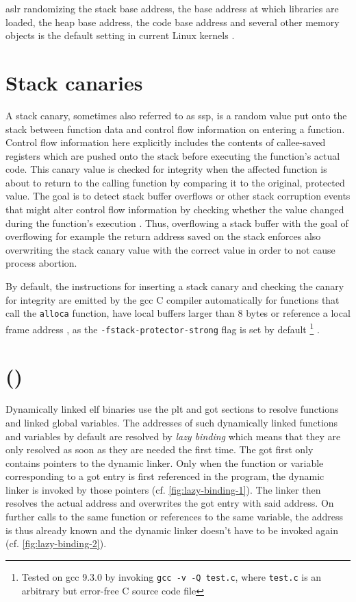\gls{aslr} randomizing the stack base address, the base address at which libraries are loaded, the heap base address, the code base address and several other memory objects is the default setting in current Linux kernels \cites{Boelen2018,Kernel2020a}[14]{OracleCorporation2020}.

\section{Stack canaries}
\label{sec:stack-canaries}

A stack canary, sometimes also referred to as \gls{ssp}, is a random value put onto the stack between function data and control flow information on entering a function.
Control flow information here explicitly includes the contents of callee-saved registers which are pushed onto the stack before executing the function's actual code.
This canary value is checked for integrity when the affected function is about to return to the calling function by comparing it to the original, protected value.
The goal is to detect stack buffer overflows or other stack corruption events that might alter control flow information by checking whether the value changed during the function's execution \cites[2]{Bierbaumer2018}{FSF2019}.
Thus, overflowing a stack buffer with the goal of overflowing for example the return address saved on the stack enforces also overwriting the stack canary value with the correct value in order to not cause process abortion.

By default, the instructions for inserting a stack canary and checking the canary for integrity are emitted by the \gls{gcc} C compiler automatically for functions that call the \texttt{alloca} function, have local buffers larger than 8 bytes or reference a local frame address \cite{FSF2019}, as the \texttt{-fstack-protector-strong} flag is set by default%
	\footnote{Tested on \gls{gcc} 9.3.0 by invoking \texttt{gcc -v -Q test.c}, where \texttt{test.c} is an arbitrary but error-free C source code file}%
.

\section{ ()}
\label{sec:relro}

Dynamically linked \gls{elf} binaries use the \gls{plt} and \gls{got} sections to resolve functions and linked global variables.
The addresses of such dynamically linked functions and variables by default are resolved by \emph{lazy binding} which means that they are only resolved as soon as they are needed the first time.
The \gls{got} first only contains pointers to the dynamic linker.
Only when the function or variable corresponding to a \gls{got} entry is first referenced in the program, the dynamic linker is invoked by those pointers (cf. \cref{fig:lazy-binding-1}).
The linker then resolves the actual address and overwrites the \gls{got} entry with said address.
On further calls to the same function or references to the same variable, the address is thus already known and the dynamic linker doesn't have to be invoked again \cites{Bendersky2011}[645\psqq]{Federico2015}{Sidhpurwala2019} (cf. \cref{fig:lazy-binding-2}).

